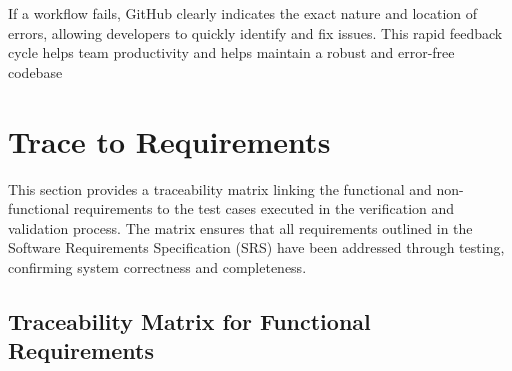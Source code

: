 \documentclass[12pt, titlepage]{article}
\begin{document}
If a workflow fails, GitHub clearly indicates the exact nature and location of errors, allowing developers to quickly identify and fix issues. This rapid feedback cycle helps team productivity and helps maintain a robust and error-free codebase



		
\section{Trace to Requirements}

This section provides a traceability matrix linking the functional and non-functional requirements to the test cases executed in the verification and validation process. The matrix ensures that all requirements outlined in the Software Requirements Specification (SRS) have been addressed through testing, confirming system correctness and completeness.

\subsection{Traceability Matrix for Functional Requirements}
\begin{table}[ht]
\centering
{}
\end{table}

\begin{table}[ht]
\centering
{}
\end{table}
\end{document}
